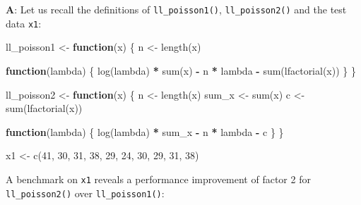 \documentclass[
]{krantz}
\makeatletter
\newenvironment{Shaded}{\begin{snugshade}}{\end{snugshade}}
\newcommand{\ControlFlowTok}[1]{\textcolor[rgb]{0.13,0.29,0.53}{\textbf{#1}}}
\newcommand{\DecValTok}[1]{\textcolor[rgb]{0.00,0.00,0.81}{#1}}
\newcommand{\KeywordTok}[1]{\textcolor[rgb]{0.13,0.29,0.53}{\textbf{#1}}}
\newcommand{\NormalTok}[1]{#1}
\newcommand{\OperatorTok}[1]{\textcolor[rgb]{0.81,0.36,0.00}{\textbf{#1}}}
\newcommand{\StringTok}[1]{\textcolor[rgb]{0.31,0.60,0.02}{#1}}
\newenvironment{kframe}{%
\medskip{}
\setlength{\fboxsep}{.8em}
 \def\at@end@of@kframe{}%
 \ifinner\ifhmode%
  \def\at@end@of@kframe{\end{minipage}}%
  \begin{minipage}{\columnwidth}%
 \fi\fi%
 \def\FrameCommand##1{\hskip\@totalleftmargin \hskip-\fboxsep
 \colorbox{shadecolor}{##1}\hskip-\fboxsep
     \hskip-\linewidth \hskip-\@totalleftmargin \hskip\columnwidth}%
 \MakeFramed {\advance\hsize-\width
   \@totalleftmargin\z@ \linewidth\hsize
   \@setminipage}}%
 {\par\unskip\endMakeFramed%
 \at@end@of@kframe}
\renewenvironment{Shaded}{\begin{kframe}}{\end{kframe}}
\renewcommand{\KeywordTok} [1]{\textcolor[rgb]{0.00,0.44,0.13}{{#1}}}
\renewcommand{\DecValTok}  [1]{\textcolor[rgb]{0.25,0.63,0.44}{{#1}}}
\renewcommand{\StringTok}  [1]{\textcolor[rgb]{0.25,0.44,0.63}{{#1}}}
\renewcommand{\NormalTok}  [1]{{#1}}
\makeatother
\begin{document}
\textbf{{A}}: Let us recall the definitions of \texttt{ll\_poisson1()}, \texttt{ll\_poisson2()} and the test data \texttt{x1}:

\begin{Shaded}
\begin{Highlighting}[]
\NormalTok{ll_poisson1 <-}\StringTok{ }\ControlFlowTok{function}\NormalTok{(x) \{}
\NormalTok{  n <-}\StringTok{ }\KeywordTok{length}\NormalTok{(x)}
  
  \ControlFlowTok{function}\NormalTok{(lambda) \{}
    \KeywordTok{log}\NormalTok{(lambda) }\OperatorTok{*}\StringTok{ }\KeywordTok{sum}\NormalTok{(x) }\OperatorTok{-}\StringTok{ }\NormalTok{n }\OperatorTok{*}\StringTok{ }\NormalTok{lambda }\OperatorTok{-}\StringTok{ }\KeywordTok{sum}\NormalTok{(}\KeywordTok{lfactorial}\NormalTok{(x))}
\NormalTok{  \}}
\NormalTok{\}}

\NormalTok{ll_poisson2 <-}\StringTok{ }\ControlFlowTok{function}\NormalTok{(x) \{}
\NormalTok{  n <-}\StringTok{ }\KeywordTok{length}\NormalTok{(x)}
\NormalTok{  sum_x <-}\StringTok{ }\KeywordTok{sum}\NormalTok{(x)}
\NormalTok{  c <-}\StringTok{ }\KeywordTok{sum}\NormalTok{(}\KeywordTok{lfactorial}\NormalTok{(x))}
  
  \ControlFlowTok{function}\NormalTok{(lambda) \{}
    \KeywordTok{log}\NormalTok{(lambda) }\OperatorTok{*}\StringTok{ }\NormalTok{sum_x }\OperatorTok{-}\StringTok{ }\NormalTok{n }\OperatorTok{*}\StringTok{ }\NormalTok{lambda }\OperatorTok{-}\StringTok{ }\NormalTok{c}
\NormalTok{  \}}
\NormalTok{\}}

\NormalTok{x1 <-}\StringTok{ }\KeywordTok{c}\NormalTok{(}\DecValTok{41}\NormalTok{, }\DecValTok{30}\NormalTok{, }\DecValTok{31}\NormalTok{, }\DecValTok{38}\NormalTok{, }\DecValTok{29}\NormalTok{, }\DecValTok{24}\NormalTok{, }\DecValTok{30}\NormalTok{, }\DecValTok{29}\NormalTok{, }\DecValTok{31}\NormalTok{, }\DecValTok{38}\NormalTok{)}
\end{Highlighting}
\end{Shaded}

A benchmark on \texttt{x1} reveals a performance improvement of factor 2 for \texttt{ll\_poisson2()} over \texttt{ll\_poisson1()}:
\end{document}
